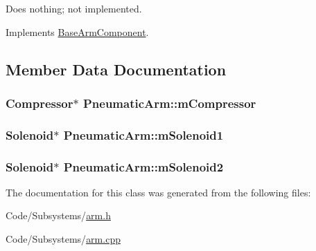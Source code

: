 \-Does nothing; not implemented. 



\-Implements \hyperlink{class_base_arm_component_abfb9d7005b18704f76b7cde4296dcca0}{\-Base\-Arm\-Component}.



\subsection{\-Member \-Data \-Documentation}
\hypertarget{class_pneumatic_arm_a4bc4e3cc68efbd806c65c0639534216c}{
\subsubsection[{m\-Compressor}]{\setlength{\rightskip}{0pt plus 5cm}\-Compressor$\ast$ {\bf \-Pneumatic\-Arm\-::m\-Compressor}}}\label{class_pneumatic_arm_a4bc4e3cc68efbd806c65c0639534216c}
\hypertarget{class_pneumatic_arm_a5872efbd0f3b4d14f1942385e92924fe}{
\subsubsection[{m\-Solenoid1}]{\setlength{\rightskip}{0pt plus 5cm}\-Solenoid$\ast$ {\bf \-Pneumatic\-Arm\-::m\-Solenoid1}}}\label{class_pneumatic_arm_a5872efbd0f3b4d14f1942385e92924fe}
\hypertarget{class_pneumatic_arm_ad091886b85bd01de3df51f8d6c85924d}{
\subsubsection[{m\-Solenoid2}]{\setlength{\rightskip}{0pt plus 5cm}\-Solenoid$\ast$ {\bf \-Pneumatic\-Arm\-::m\-Solenoid2}}}\label{class_pneumatic_arm_ad091886b85bd01de3df51f8d6c85924d}


\-The documentation for this class was generated from the following files\-:\begin{DoxyCompactItemize}
\item 
\-Code/\-Subsystems/\hyperlink{arm_8h}{arm.\-h}\item 
\-Code/\-Subsystems/\hyperlink{arm_8cpp}{arm.\-cpp}\end{DoxyCompactItemize}
